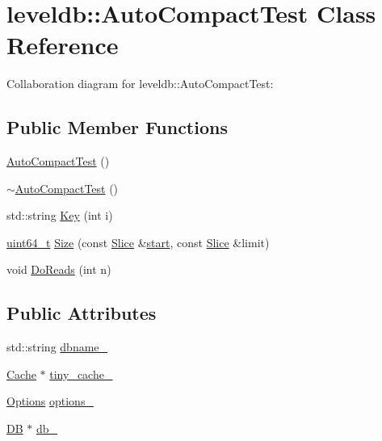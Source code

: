 \hypertarget{classleveldb_1_1_auto_compact_test}{\section{leveldb\-:\-:Auto\-Compact\-Test Class Reference}
\label{classleveldb_1_1_auto_compact_test}
}


Collaboration diagram for leveldb\-:\-:Auto\-Compact\-Test\-:
\subsection*{Public Member Functions}
\begin{DoxyCompactItemize}
\item 
\hyperlink{classleveldb_1_1_auto_compact_test_a31fe0ded855f188fac1650c70849760c}{Auto\-Compact\-Test} ()
\item 
\hyperlink{classleveldb_1_1_auto_compact_test_a671873887bb99ee3731add4298a8df0b}{$\sim$\-Auto\-Compact\-Test} ()
\item 
std\-::string \hyperlink{classleveldb_1_1_auto_compact_test_a02993bed0b92d580bb0a51b92191eba9}{Key} (int i)
\item 
\hyperlink{stdint_8h_aaa5d1cd013383c889537491c3cfd9aad}{uint64\-\_\-t} \hyperlink{classleveldb_1_1_auto_compact_test_a4be489ee1b3868f61d9976935e9b2bc4}{Size} (const \hyperlink{classleveldb_1_1_slice}{Slice} \&\hyperlink{db__bench_8cc_ab376b87f96a574a793c03c53e75afec8}{start}, const \hyperlink{classleveldb_1_1_slice}{Slice} \&limit)
\item 
void \hyperlink{classleveldb_1_1_auto_compact_test_a1d1feea1aef1257e461c35eb5b51fa52}{Do\-Reads} (int n)
\end{DoxyCompactItemize}
\subsection*{Public Attributes}
\begin{DoxyCompactItemize}
\item 
std\-::string \hyperlink{classleveldb_1_1_auto_compact_test_a9caaa257e508397f94fbe646893b7b3b}{dbname\-\_\-}
\item 
\hyperlink{classleveldb_1_1_cache}{Cache} $\ast$ \hyperlink{classleveldb_1_1_auto_compact_test_a189cb5733d861b7df8c3bf945180afe5}{tiny\-\_\-cache\-\_\-}
\item 
\hyperlink{structleveldb_1_1_options}{Options} \hyperlink{classleveldb_1_1_auto_compact_test_ad7f1f35214065627e4cadd0468d22c21}{options\-\_\-}
\item 
\hyperlink{classleveldb_1_1_d_b}{D\-B} $\ast$ \hyperlink{classleveldb_1_1_auto_compact_test_a9e8d5f9bf0546b7d7fdf2128c66d8761}{db\-\_\-}
\end{DoxyCompactItemize}


